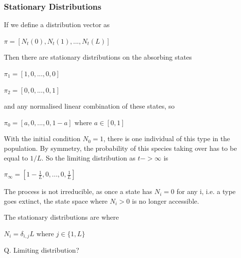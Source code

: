 \documentclass{article}
\begin{document}
\subsubsection{Stationary Distributions}

If we define a distribution vector as

$\pi = [N_t(0), N_t(1),...,N_t(L)]$

Then there are stationary distributions on the absorbing states

$\pi_1 = [1, 0,...,0,0]$

$\pi_2 = [0, 0,...,0,1]$

and any normalised linear combination of these states, so

$\pi_0 = [a, 0,...,0,1-a] \text{ where } a \in [0,1]$ 

With the initial condition $N_0 = 1$, there is one individual of this type in the population. By symmetry, the probability of this species taking over has to be equal to $1/L$. So the limiting distribution as $t -> \infty$ is

$\pi_{\infty} = [1-\frac{1}{L},0,...,0,\frac{1}{L}]$



The process is not irreducible, as once a state has $N_i = 0$ for any i, i.e. a type goes extinct, the state space where $N_i >0$ is no longer accessible.

The stationary distributions are where 

$N_i = \delta_{i,j}L \text{ where } j \in \{1,L\}$

Q. Limiting distribution?
\end{document}

